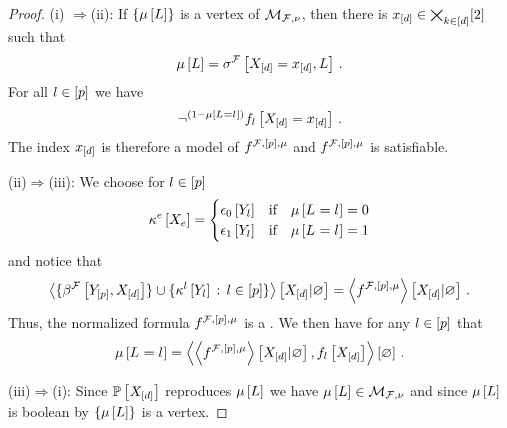 \begin{proof}
(i)
    $\Rightarrow$(ii):
    If $\{\mu\left[L\right]\}$ is a vertex of $\mathcal{M}_{\mathcal{F},\nu}$, then there is $x_{[d]}\in\bigtimes_{k\in[d]}[2]$ such that %
    \begin{align*}
        \mu\left[L\right] = \sigma^{\mathcal{F}}\left[X_{[d]}=x_{[d]},L\right] \, .
    \end{align*}
    For all $l\in[p]$ we have
    \begin{align*}
        \lnot^{(1-\mu\left[L_{}=l_{}\right])}f_{l}\left[X_{[d]}=x_{[d]}\right] \, .
    \end{align*}
    The index $x_{[d]}$ is therefore a model of $f^{\mathcal{F},[p],\mu}$ and $f^{\mathcal{F},[p],\mu}$ is satisfiable.

    (ii)$\Rightarrow$(iii):
    We choose for $l\in[p]$
    \begin{align*}
        \kappa^{e}\left[X_{e}\right] = \begin{cases}
                         \epsilon_0\left[Y_{l}\right] & \text{if} \quad \mu\left[L_{}=l_{}\right]=0 \\
                         \epsilon_1\left[Y_{l}\right] & \text{if} \quad \mu\left[L_{}=l_{}\right]=1 \\
        \end{cases}
    \end{align*}
    and notice that
    \begin{align*}
        \left\langle \{\beta^{\mathcal{F}}\left[Y_{[p]},X_{[d]}\right]\}
        \cup \{\kappa^{l}\left[Y_{l}\right] \,:\, l\in[p]\}
        \right\rangle \left[ X_{[d]} | \varnothing \right] = \left\langle f^{\mathcal{F},[p],\mu}\right\rangle \left[ X_{[d]} | \varnothing \right] \, .
    \end{align*}
    Thus, the normalized formula $f^{\mathcal{F},[p],\mu}$ is a \HardLogicNetwork{}.
    We then have for any $l\in[p]$ that
    \begin{align*}
        \mu\left[L_{}=l_{}\right] = \left\langle \left\langle f^{\mathcal{F},[p],\mu}\right\rangle \left[ X_{[d]} | \varnothing \right],f_{l}\left[X_{[d]}\right]\right\rangle \left[ \varnothing \right]\, .
    \end{align*}

    (iii)$\Rightarrow$(i):
    Since $\mathbb{P}\left[X_{[d]}\right]$ reproduces $\mu\left[L\right]$ we have $\mu\left[L\right]\in\mathcal{M}_{\mathcal{F},\nu}$ and since $\mu\left[L\right]$ is boolean by  $\{\mu\left[L\right]\}$ is a vertex.
\end{proof}

